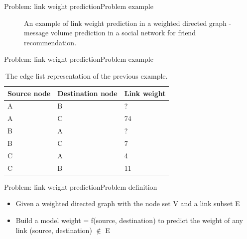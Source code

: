 \documentclass{beamer}
\begin{document}
\begin{frame}{Problem: link weight prediction}{Problem example}
	\begin{figure}[H]\centering
		\caption{
			An example of link weight prediction in a weighted directed graph -
			message volume prediction in a social network for friend recommendation.
		}
		\label{fig:example}
	\end{figure}
\end{frame}

\begin{frame}{Problem: link weight prediction}{Problem example}
	\begin{table}[H]\centering
		\caption{The edge list representation of the previous example.}
		\begin{tabularx}{\textwidth}{|X|X|X|}  \hline
			Source node & Destination node & Link weight \\ \hline
			A & B & ? \\ \hline
			A & C & 74 \\ \hline
			B & A & ? \\ \hline
			B & C & 7 \\ \hline
			C & A & 4 \\ \hline
			C & B & 11 \\ \hline
		\end{tabularx}
		\label{tab:example}
	\end{table}
\end{frame}

\begin{frame}{Problem: link weight prediction}{Problem definition}
	\begin{itemize}
		\item Given a weighted directed graph with the node set V and a link subset E
		\item Build a model weight = f(source, destination) to predict the weight of any link (source, destination) $ \notin $ E
	\end{itemize}
\end{frame}
\end{document}
